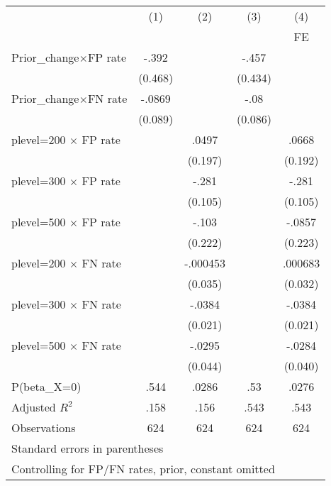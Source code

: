 \begin{tabular}{l*{4}{c}}
\hline\hline
                &\multicolumn{1}{c}{(1)}&\multicolumn{1}{c}{(2)}&\multicolumn{1}{c}{(3)}&\multicolumn{1}{c}{(4)}\\
                &\multicolumn{1}{c}{}&\multicolumn{1}{c}{}&\multicolumn{1}{c}{}&\multicolumn{1}{c}{FE}\\
\hline
Prior\_change$\times$FP rate&    -.392&         &    -.457&         \\
                &  (0.468)&         &  (0.434)&         \\
Prior\_change$\times$FN rate&   -.0869&         &     -.08&         \\
                &  (0.089)&         &  (0.086)&         \\
plevel=200 $\times$ FP rate&         &    .0497&         &    .0668\\
                &         &  (0.197)&         &  (0.192)\\
plevel=300 $\times$ FP rate&         &    -.281&         &    -.281\\
                &         &  (0.105)&         &  (0.105)\\
plevel=500 $\times$ FP rate&         &    -.103&         &   -.0857\\
                &         &  (0.222)&         &  (0.223)\\
plevel=200 $\times$ FN rate&         & -.000453&         &  .000683\\
                &         &  (0.035)&         &  (0.032)\\
plevel=300 $\times$ FN rate&         &   -.0384&         &   -.0384\\
                &         &  (0.021)&         &  (0.021)\\
plevel=500 $\times$ FN rate&         &   -.0295&         &   -.0284\\
                &         &  (0.044)&         &  (0.040)\\
\hline
P(beta\_X=0)     &     .544&    .0286&      .53&    .0276\\
Adjusted \(R^{2}\)&     .158&     .156&     .543&     .543\\
Observations    &      624&      624&      624&      624\\
\hline\hline
\multicolumn{5}{l}{\footnotesize Standard errors in parentheses}\\
\multicolumn{5}{l}{\footnotesize Controlling for FP/FN rates, prior, constant omitted}\\
\end{tabular}

